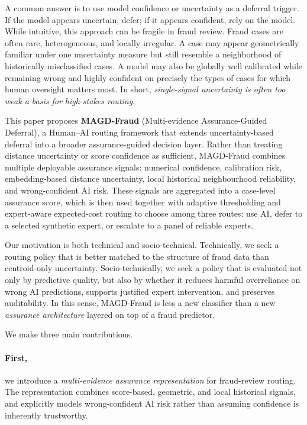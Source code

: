 A common answer is to use model confidence or uncertainty as a deferral trigger. If the model appears uncertain, defer; if it appears confident, rely on the model. While intuitive, this approach can be fragile in fraud review. Fraud cases are often rare, heterogeneous, and locally irregular. A case may appear geometrically familiar under one uncertainty measure but still resemble a neighborhood of historically misclassified cases. A model may also be globally well calibrated while remaining wrong and highly confident on precisely the types of cases for which human oversight matters most. In short, \emph{single-signal uncertainty is often too weak a basis for high-stakes routing}.

This paper proposes \textbf{MAGD-Fraud} (Multi-evidence Assurance-Guided Deferral), a Human--AI routing framework that extends uncertainty-based deferral into a broader assurance-guided decision layer. Rather than treating distance uncertainty or score confidence as sufficient, MAGD-Fraud combines multiple deployable assurance signals: numerical confidence, calibration risk, embedding-based distance uncertainty, local historical neighbourhood reliability, and wrong-confident AI risk. These signals are aggregated into a case-level assurance score, which is then used together with adaptive thresholding and expert-aware expected-cost routing to choose among three routes: use AI, defer to a selected synthetic expert, or escalate to a panel of reliable experts.

Our motivation is both technical and socio-technical. Technically, we seek a routing policy that is better matched to the structure of fraud data than centroid-only uncertainty. Socio-technically, we seek a policy that is evaluated not only by predictive quality, but also by whether it reduces harmful overreliance on wrong AI predictions, supports justified expert intervention, and preserves auditability. In this sense, MAGD-Fraud is less a new classifier than a new \emph{assurance architecture} layered on top of a fraud predictor.

We make three main contributions.

\paragraph{First,} we introduce a \emph{multi-evidence assurance representation} for fraud-review routing. The representation combines score-based, geometric, and local historical signals, and explicitly models wrong-confident AI risk rather than assuming confidence is inherently trustworthy.

